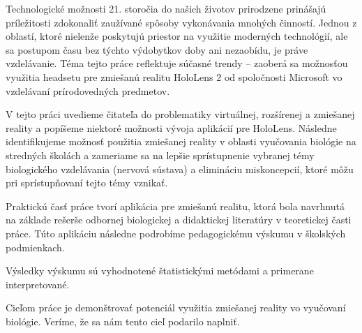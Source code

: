 Technologické možnosti 21. storočia do našich životov prirodzene prinášajú príležitosti zdokonaliť zaužívané spôsoby vykonávania mnohých činností. Jednou z oblastí, ktoré nielenže poskytujú priestor na využitie moderných technológií,
ale sa postupom času bez týchto výdobytkov doby ani nezaobídu, je práve vzdelávanie. Téma tejto práce reflektuje súčasné trendy {--} zaoberá sa možnosťou využitia headsetu pre zmiešanú realitu HoloLens 2 od spoločnosti Microsoft vo 
vzdelávaní prírodovedných predmetov. 

V tejto práci uvedieme čitateľa do problematiky virtuálnej, rozšírenej a zmiešanej reality a popíšeme niektoré možnosti vývoja aplikácií pre HoloLens. Následne identifikujeme možnosť použitia zmiešanej reality v oblasti 
vyučovania biológie na stredných školách a zameriame sa na lepšie sprístupnenie vybranej témy biologického vzdelávania (nervová sústava) a elimináciu miskoncepcií, ktoré môžu pri sprístupňovaní tejto témy vznikať.

Praktickú časť práce tvorí aplikácia pre zmiešanú realitu, ktorá bola navrhnutá na základe rešerše odbornej biologickej a didaktickej literatúry v teoretickej časti práce. 
Túto aplikáciu následne podrobíme pedagogickému výskumu v školských podmienkach.

Výsledky výskumu sú vyhodnotené štatistickými metódami a primerane interpretované. 

Cieľom práce je demonštrovať potenciál využitia zmiešanej reality vo vyučovaní biológie. Veríme, že sa nám tento cieľ podarilo naplniť.
